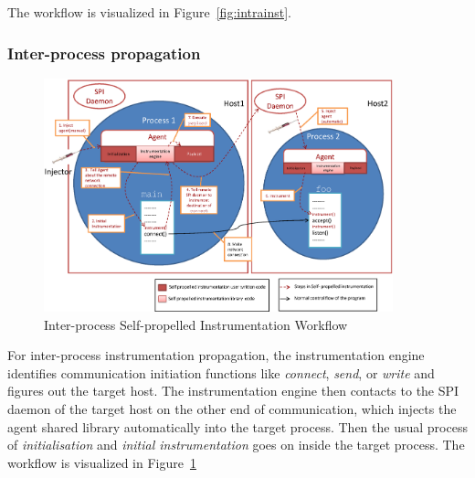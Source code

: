 The workflow is visualized in Figure~\ref{fig:intrainst}.

\subsubsection{Inter-process propagation}
\begin{figure}[ht]
  \centering
  \includegraphics[width=0.90\textwidth]{figure/interprocess.eps}
  \caption{Inter-process Self-propelled Instrumentation Workflow}
  \label{fig:interinst}
\end{figure}

For inter-process instrumentation propagation, the instrumentation engine
identifies communication initiation functions like {\em connect}, {\em send}, or
{\em write} and figures out the target host.
The instrumentation engine then contacts to the SPI daemon of the target host on
the other end of communication, which injects the agent shared library automatically
into the target process. 
Then the usual process of \textit{initialisation} and \textit{initial
  instrumentation} goes on inside the target process. 
The workflow is visualized in Figure~\ref{fig:interinst}
